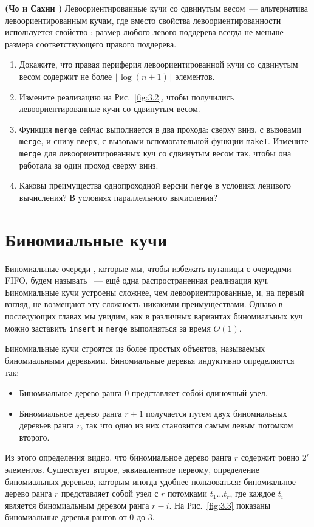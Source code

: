\begin{exercise}\label{ex:3.4}
  \textbf{(Чо и Сахни \cite{ChoSahni1996})} Левоориентированные кучи
  со сдвинутым весом~--- альтернатива левоориентированным кучам, где
  вместо свойства левоориентированности используется свойство
  : размер любого левого поддерева всегда не меньше размера
  соответствующего правого поддерева.
  \begin{enumerate}
  \item Докажите, что правая периферия левоориентированной кучи со
    сдвинутым весом содержит не более $\lfloor \log(n+1) \rfloor$ элементов.
  \item Измените реализацию на Рис.~\ref{fig:3.2}, чтобы получились
    левоориентированные кучи со сдвинутым весом.
  \item Функция \lstinline!merge! сейчас выполняется в два прохода:
    сверху вниз, с вызовами \lstinline!merge!, и снизу вверх, с
    вызовами вспомогательной функции \lstinline!makeT!. Измените
    \lstinline!merge! для левоориентированных куч со сдвинутым весом
    так, чтобы она работала за один проход сверху вниз.
  \item Каковы преимущества однопроходной версии \lstinline!merge! в
    условиях ленивого вычисления? В условиях параллельного вычисления?
  \end{enumerate}
\end{exercise}

\section{Биномиальные кучи}
\label{sc:3.2}

Биномиальные очереди \cite{Vuillemin1978, Brown1978}, которые мы,
чтобы избежать путаницы с очередями FIFO, будем называть ~--- ещё одна распространенная реализация
куч. Биномиальные кучи устроены сложнее, чем левоориентированные, и, на
первый взгляд, не возмещают эту сложность никакими
преимуществами. Однако в последующих главах мы увидим, как в различных
вариантах биномиальных куч можно заставить \lstinline!insert! и
\lstinline!merge! выполняться за время $O(1)$.

Биномиальные кучи строятся из более простых объектов, называемых
биномиальными деревьями. Биномиальные деревья индуктивно определяются
так:
\begin{itemize}
\item Биномиальное дерево ранга 0 представляет собой одиночный узел.
\item Биномиальное дерево ранга $r+1$ получается путем
   двух биномиальных деревьев ранга $r$, так
  что одно из них становится самым левым потомком второго.
\end{itemize}
Из этого определения видно, что биномиальное дерево ранга $r$ содержит
ровно $2^r$ элементов.  Существует второе, эквивалентное первому,
определение биномиальных деревьев, которым иногда удобнее
пользоваться: биномиальное дерево ранга $r$ представляет собой узел
с $r$ потомками $t_1\ldots t_r$, где каждое $t_i$ является
биномиальным деревом ранга $r-i$.  На Рис.~\ref{fig:3.3} показаны
биномиальные деревья рангов от 0 до 3.

